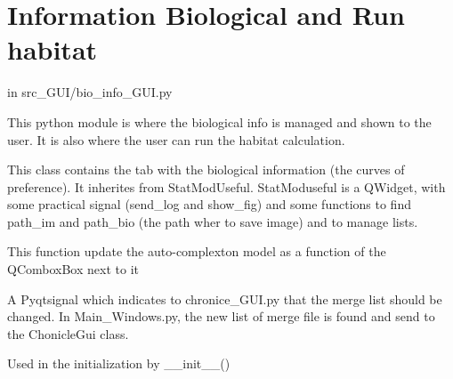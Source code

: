 \documentclass[letterpaper,10pt,english]{sphinxmanual}
\begin{document}
\section{Information Biological and Run habitat}
\label{\detokenize{index:information-biological-and-run-habitat}}
in src\_GUI/bio\_info\_GUI.py

This python module is where the biological info is managed and shown to the user.
It is also where the user can run the habitat calculation.
\label{\detokenize{index:module-src_GUI.bio_info_GUI}}

\begin{fulllineitems}
\label{\detokenize{index:src_GUI.bio_info_GUI.BioInfo}}
This class contains the tab with the biological information (the curves of preference). It inherites from
StatModUseful. StatModuseful is a QWidget, with some practical signal (send\_log and show\_fig) and some functions
to find path\_im and path\_bio (the path wher to save image) and to manage lists.

\begin{fulllineitems}
\label{\detokenize{index:src_GUI.bio_info_GUI.BioInfo.get_autocompletion}}
This function update the auto-complexton model as a function of the QComboxBox next to it

\end{fulllineitems}


\begin{fulllineitems}
\label{\detokenize{index:src_GUI.bio_info_GUI.BioInfo.get_list_merge}}
A Pyqtsignal which indicates to chronice\_GUI.py that the merge list should be changed. In Main\_Windows.py,
the new list of merge file is found and send to the ChonicleGui class.

\end{fulllineitems}


\begin{fulllineitems}
\label{\detokenize{index:src_GUI.bio_info_GUI.BioInfo.init_iu}}
Used in the initialization by \_\_init\_\_()


\end{fulllineitems}
\end{fulllineitems}
\end{document}
